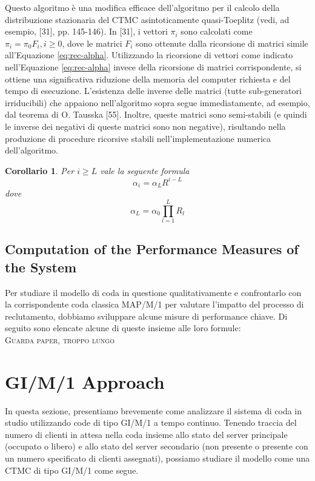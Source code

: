 \documentclass[11pt]{article}
\newtheorem{corollario}[teorema]{Corollario}
\begin{document}
Questo algoritmo è una modifica efficace dell'algoritmo per il calcolo della distribuzione stazionaria del CTMC asintoticamente quasi-Toeplitz (vedi, ad esempio, [31], pp. 145-146). In [31], i vettori $\pi_i$ sono calcolati come $\pi_i = \pi_0 F_i , i \geq 0$, dove le matrici $F_i$ sono ottenute dalla ricorsione di matrici simile all'Equazione \ref{eq:rec-alpha}. Utilizzando la ricorsione di vettori come indicato nell'Equazione \ref{eq:rec-alpha} invece della ricorsione di matrici corrispondente, si ottiene una significativa riduzione della memoria del computer richiesta e del tempo di esecuzione. L'esistenza delle inverse delle matrici (tutte sub-generatori irriducibili) che appaiono nell'algoritmo sopra segue immediatamente, ad esempio, dal teorema di O. Tausska [55]. Inoltre, queste matrici sono semi-stabili (e quindi le inverse dei negativi di queste matrici sono non negative), risultando nella produzione di procedure ricorsive stabili nell'implementazione numerica dell'algoritmo.

\begin{corollario}
    Per $i \geq L$  vale la seguente formula
    \begin{equation}
        \alpha_i = \alpha_L R^{i-L}
    \end{equation}
    dove
    \begin{equation}
        \alpha_L = \alpha_0 \prod_{l=1}^L R_l
    \end{equation}
\end{corollario}

\subsection{Computation of the Performance Measures of the System}
Per studiare il modello di coda in questione qualitativamente e confrontarlo con la corrispondente coda classica MAP/M/1 per valutare l'impatto del processo di reclutamento, dobbiamo sviluppare alcune misure di performance chiave. Di seguito sono elencate alcune di queste insieme alle loro formule: \\

\textsc{Guarda paper, troppo lungo}

\clearpage

\section{GI/M/1 Approach}

In questa sezione, presentiamo brevemente come analizzare il sistema di coda in studio utilizzando code di tipo GI/M/1 a tempo continuo. Tenendo traccia del numero di clienti in attesa nella coda insieme allo stato del server principale (occupato o libero) e allo stato del server secondario (non presente o presente con un numero specificato di clienti assegnati), possiamo studiare il modello come una CTMC di tipo GI/M/1 come segue. \vspace*{0.4cm}
\end{document}
